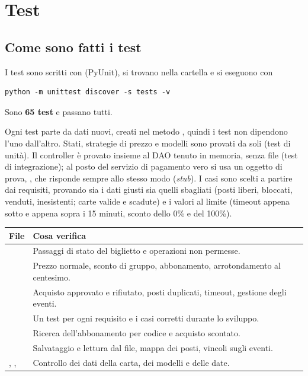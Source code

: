 \section{Test}
\label{sec:test}

\subsection{Come sono fatti i test}

I test sono scritti con  (PyUnit), si trovano nella cartella  e si eseguono con

\par\noindent\begin{minipage}{\linewidth}
\begin{lstlisting}
python -m unittest discover -s tests -v
\end{lstlisting}
\end{minipage}\par

Sono \textbf{65 test} e passano tutti.

Ogni test parte da dati nuovi, creati nel metodo , quindi i test non dipendono l'uno dall'altro. Stati, strategie di prezzo e modelli sono provati da soli (test di unità). Il controller è provato insieme al DAO tenuto in memoria, senza file (test di integrazione); al posto del servizio di pagamento vero si usa un oggetto di prova, , che risponde sempre allo stesso modo (\emph{stub}). I casi sono scelti a partire dai requisiti, provando sia i dati giusti sia quelli sbagliati (posti liberi, bloccati, venduti, inesistenti; carte valide e scadute) e i valori al limite (timeout appena sotto e appena sopra i 15 minuti, sconto dello 0\% e del 100\%).

{\small
\begin{tabularx}{\textwidth}{@{}L{6.0cm}Y@{}}
\toprule
\textbf{File} & \textbf{Cosa verifica} \\
\midrule
{} & Passaggi di stato del biglietto e operazioni non permesse. \\
 & Prezzo normale, sconto di gruppo, abbonamento, arrotondamento al centesimo. \\
 & Acquisto approvato e rifiutato, posti duplicati, timeout, gestione degli eventi. \\
 & Un test per ogni requisito e i casi corretti durante lo sviluppo. \\
 & Ricerca dell'abbonamento per codice e acquisto scontato. \\
 & Salvataggio e lettura dal file, mappa dei posti, vincoli sugli eventi. \\
, ,  & Controllo dei dati della carta, dei modelli e delle date. \\
\bottomrule
\end{tabularx}}


